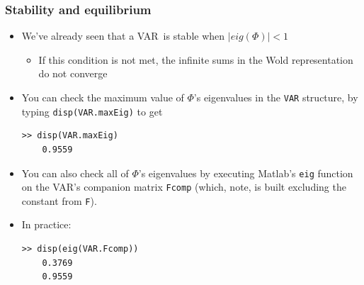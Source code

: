 \documentclass[10pt,english,t,aspectratio=169,ignorenonframetext]{beamer}
\newenvironment{xframe}[1][]
{\begin{frame}[fragile,environment=xframe,#1]}
{\end{frame}}
\begin{document}
\begin{xframe}
\frametitle{Stability and equilibrium}

\begin{itemize}
\item We've already seen that a VAR\ is stable when $\left\vert eig(\Phi
)\right\vert <1$\smallskip

\begin{itemize}
\item If this condition is not met, the infinite sums in the Wold
representation do not converge\bigskip
\end{itemize}

\pause

\item You can check the maximum value of $\Phi $'s eigenvalues in the %
\colorbox{script!80}{\small\texttt{VAR}} structure, by typing %
\colorbox{script!80}{\small\texttt{disp(VAR.maxEig)}} to get \medskip

\begin{minipage}{0.7\textwidth}
\small\begin{verbatim}
>> disp(VAR.maxEig)
    0.9559
\end{verbatim}
\end{minipage}\pause\medskip

\item You can also check all of $\Phi $'s eigenvalues by executing Matlab's %
\colorbox{script!80}{\small\texttt{eig}} function on the VAR's companion
matrix \colorbox{script!80}{\small\texttt{Fcomp}} (which, note, is built
excluding the constant from \colorbox{script!80}{\small\texttt{F}}).\bigskip

\item In practice:\medskip

\begin{minipage}{0.7\textwidth}
\small\begin{verbatim}
>> disp(eig(VAR.Fcomp))
    0.3769
    0.9559
\end{verbatim}
\end{minipage}
\end{itemize}
\end{xframe}

\end{document}
